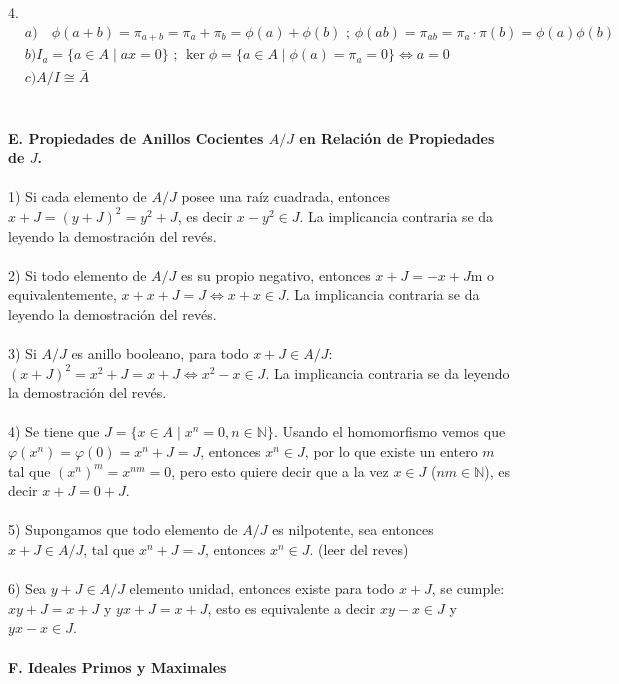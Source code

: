 \documentclass{article}
\begin{document}
4. 
\begin{equation*}
\begin{aligned}
    &a) \quad \phi(a+b)=\pi_{a+b}=\pi_a + \pi_b = \phi(a) + \phi(b) \text{ ; } \phi(ab) = \pi_{ab} = \pi_a \cdot \pi(b) = \phi(a) \phi(b) \\
    &b) I_a = \{a \in A \mid ax = 0 \} \text{ ; } \ker{\phi}=\{a \in A \mid \phi(a)=\pi_a = 0 \} \Longleftrightarrow a = 0 \\
    &c) A/I \cong \bar{A}
\end{aligned}
\end{equation*}
\\
\\
\textbf{E. Propiedades de Anillos Cocientes $A/J$ en Relación de Propiedades de $J$.}
\\
\\
1) Si cada elemento de $A/J$ posee una raíz cuadrada, entonces $x+J=(y+J)^2=y^2+J$, es decir $x-y^2 \in J$. La implicancia contraria se da leyendo la demostración del revés.
\\
\\
2) Si todo elemento de $A/J$ es su propio negativo, entonces $x+J=-x+J$m o equivalentemente, $x+x+J=J \Longleftrightarrow x+x \in J$. La implicancia contraria se da leyendo la demostración del revés.
\\
\\
3) Si $A/J$ es anillo booleano, para todo $x+J \in A/J$: $(x+J)^2=x^2+J=x+J \Longleftrightarrow x^2 -x \in J$. La implicancia contraria se da leyendo la demostración del revés.
\\
\\
4) Se tiene que $J=\{x \in A \mid x^n =0, n \in \mathbb{N} \}$. Usando el homomorfismo vemos que $\varphi(x^n)=\varphi(0)=x^n+J=J$, entonces $x^n \in J$, por lo que existe un entero $m$ tal que $(x^n)^m=x^{nm}=0$, pero esto quiere decir que a la vez $x \in J$ ($nm \in \mathbb{N}$), es decir $x+J=0+J$.
\\
\\
5) Supongamos que todo elemento de $A/J$ es nilpotente, sea entonces $x+J \in A/J$, tal que $x^n +J =J$, entonces $x^n \in J$. (leer del reves)
\\
\\
6) Sea $y+J \in A/J$ elemento unidad, entonces existe para todo $x+J$, se cumple: $xy+J=x+J$ y $yx+J=x+J$, esto es equivalente a decir $xy-x \in J$ y $yx-x \in J$.
\\
\\
\textbf{F. Ideales Primos y Maximales}
\\
\end{document}

